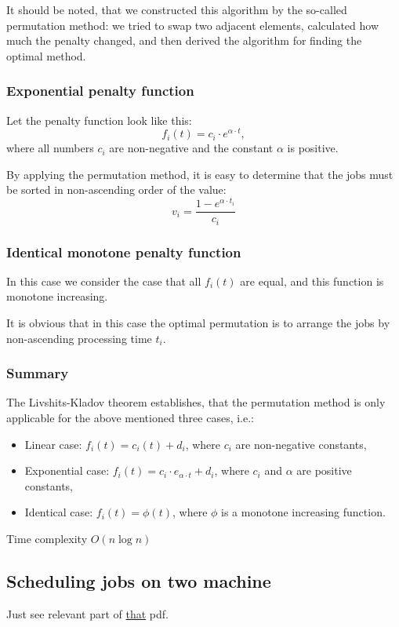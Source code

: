 \documentclass[8pt, a4paper, oneside, twocolumn]{extarticle}
\begin{document}
It should be noted, that we constructed this algorithm by the so-called permutation method: we tried to swap two adjacent elements, calculated how much the penalty changed, and then derived the algorithm for finding the optimal method.
\subsubsection{Exponential penalty function}

Let the penalty function look like this: $$f_i(t) = c_i \cdot e^{\alpha \cdot t},$$ where all numbers $c_i$ are non-negative and the constant $\alpha$ is positive.

By applying the permutation method, it is easy to determine that the jobs must be sorted in non-ascending order of the value: $$v_i = \frac{1 - e^{\alpha \cdot t_i}}{c_i}$$
\subsubsection{Identical monotone penalty function}

In this case we consider the case that all $f_i(t)$ are equal, and this function is monotone increasing.

It is obvious that in this case the optimal permutation is to arrange the jobs by non-ascending processing time $t_i$.
\subsubsection{Summary}
The Livshits-Kladov theorem establishes, that the permutation method is only applicable for the above mentioned three cases, i.e.:
\begin{itemize}
    \item Linear case: $f_i(t) = c_i(t) + d_i$, where $c_i$ are non-negative constants,
    \item Exponential case: $f_i(t) = c_i \cdot e_{\alpha \cdot t} + d_i$, where $c_i$ and $\alpha$ are positive constants,
    \item Identical case: $f_i(t) = \phi(t)$, where $\phi$ is a monotone increasing function.
\end{itemize}
Time complexity $O(n \log n)$
\subsection{Scheduling jobs on two machine}
Just see relevant part of \href{https://github.com/sourabh2311/Competitive-Programming/blob/master/Reference%20Notes/Scheduling%20jobs%20on%20two%20machines/P402.pdf}{that} pdf.
\end{document}
